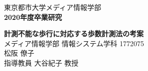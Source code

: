 \documentclass[fleqn,11pt]{jreport}
\begin{document}
\baselineskip 21.5pt

\begin{titlepage}
\vspace*{3cm}
\begin{center}
{\Large\gt 東京都市大学メディア情報学部}\\
\vspace*{0.5cm}
{\Large\bf 2020年度卒業研究}\\
\vspace{1.5cm}

{\huge\bf 計測不能な歩行に対応する歩数計測法の考案}\\


\vspace{9cm}
{\Large メディア情報学部 情報システム学科 1772075}\\
{\Large 松阪 僚子}\\
\vspace*{0.5cm}
{\Large 指導教員 大谷紀子 教授}\\
\end{center}
\end{titlepage}

\tableofcontents
\cleardoublepage





%




\appendix

\end{document}
